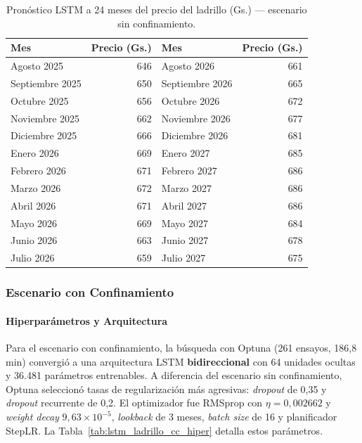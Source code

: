 \begin{table}[H]
\centering
\caption{Pronóstico LSTM a 24 meses del precio del ladrillo (Gs.) --- escenario sin confinamiento.}
\label{tab:lstm_ladrillo_pred_sin_covid}
\begin{tabular}{lr|lr}
\toprule
\textbf{Mes} & \textbf{Precio (Gs.)} & \textbf{Mes} & \textbf{Precio (Gs.)} \\
\midrule
Agosto 2025      & 646 & Agosto 2026      & 661 \\
Septiembre 2025  & 650 & Septiembre 2026  & 665 \\
Octubre 2025     & 656 & Octubre 2026     & 672 \\
Noviembre 2025   & 662 & Noviembre 2026   & 677 \\
Diciembre 2025   & 666 & Diciembre 2026   & 681 \\
Enero 2026       & 669 & Enero 2027       & 685 \\
Febrero 2026     & 671 & Febrero 2027     & 686 \\
Marzo 2026       & 672 & Marzo 2027       & 686 \\
Abril 2026       & 671 & Abril 2027       & 686 \\
Mayo 2026        & 669 & Mayo 2027        & 684 \\
Junio 2026       & 663 & Junio 2027       & 678 \\
Julio 2026       & 659 & Julio 2027       & 675 \\
\bottomrule
\end{tabular}
\end{table}


\clearpage
\subsubsection{Escenario con Confinamiento}

\paragraph{Hiperparámetros y Arquitectura}

\justify
Para el escenario con confinamiento, la búsqueda con Optuna (261 ensayos, 186,8 min) convergió a una arquitectura LSTM \textbf{bidireccional} con 64 unidades ocultas y 36.481 parámetros entrenables. A diferencia del escenario sin confinamiento, Optuna seleccionó tasas de regularización más agresivas: \textit{dropout} de 0,35 y \textit{dropout} recurrente de 0,2. El optimizador fue RMSprop con $\eta=0{,}002662$ y \textit{weight decay} $9{,}63 \times 10^{-5}$, \textit{lookback} de 3 meses, \textit{batch size} de 16 y planificador StepLR. La Tabla~\ref{tab:lstm_ladrillo_cc_hiper} detalla estos parámetros.

